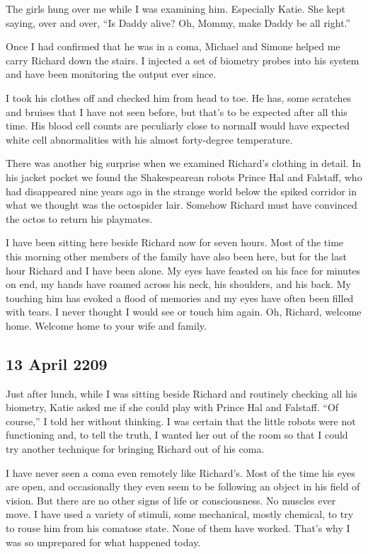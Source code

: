 \documentclass[]{article}
\begin{document}
{	The girls hung over me while I was examining him.  Especially Katie.  She kept saying, over and over, “Is Daddy alive? Oh, Mommy, make Daddy be all right.”
	
	Once I had confirmed that he was in a coma, Michael and Simone helped me carry Richard down the stairs.  I injected a set of biometry probes into his system and have been monitoring the output ever since.
	
	I took his clothes off and checked him from head to toe.  He has, some scratches and bruises that I have not seen before, but that’s to be expected after all this time.  His blood cell counts are peculiarly close to normalI would have expected white cell abnormalities with his almost forty-degree temperature.
	
	There was another big surprise when we examined Richard’s clothing in detail.  In his jacket pocket we found the Shakespearean robots Prince Hal and Falstaff, who had disappeared nine years ago in the strange world below the spiked corridor in what we thought was the octospider lair.  Somehow Richard must have convinced the octos to return his playmates.
	
	I have been sitting here beside Richard now for seven hours.  Most of the time this morning other members of the family have also been here, but for the last hour Richard and I have been alone.  My eyes have feasted on his face for minutes on end, my hands have roamed across his neck, his shoulders, and his back.  My touching him has evoked a flood of memories and my eyes have often been filled with tears.  I never thought I would see or touch him again.  Oh, Richard, welcome home.  Welcome home to your wife and family.

\subsection*{13 April 2209}

Just after lunch, while I was sitting beside Richard and routinely checking all his biometry, Katie asked me if she could play with Prince Hal and Falstaff.  “Of course,” I told her without thinking.  I was certain that the little robots were not functioning and, to tell the truth, I wanted her out of the room so that I could try another technique for bringing Richard out of his coma.

I have never seen a coma even remotely like Richard’s.  Most of the time his eyes are open, and occasionally they even seem to be following an object in his field of vision.  But there are no other signs of life or consciousness.  No muscles ever move.  I have used a variety of stimuli, some mechanical, mostly chemical, to try to rouse him from his comatose state.  None of them have worked.  That’s why I was so unprepared for what happened today.

}
\end{document}
